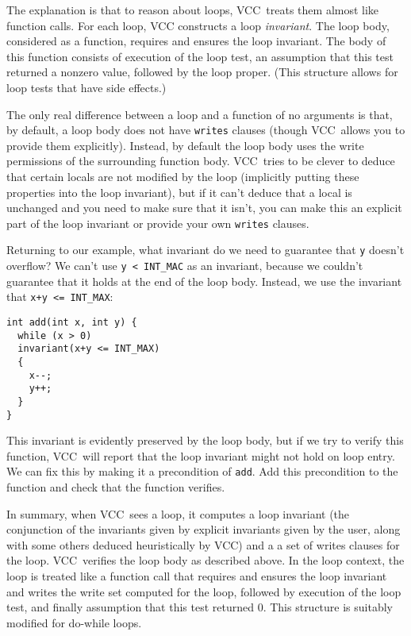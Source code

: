 \documentclass{report}
\newcommand{\Q}[1]{\lstinline~#1~}
\newcommand{\VCC}{VCC}
\newcommand{\Def}[1]{\emph{#1}}
\begin{document}
The explanation is that to reason about loops, \VCC\ treats them
almost like function calls. For each loop, VCC constructs a loop
\Def{invariant}. The loop body, considered as a function, requires
and ensures the loop invariant. The body of this function consists of
execution of the loop test, an assumption that this test returned a
nonzero value, followed by the loop proper. (This structure allows for
loop tests that have side effects.) 

The only real difference between a loop and a function of no arguments
is that, by default, a loop body does not have \Q{writes} clauses
(though \VCC\ allows you to provide them explicitly). Instead,  by
default the loop
body uses the write permissions of the surrounding function body.
\VCC\ tries to be clever to deduce that certain locals are not
modified by the loop (implicitly putting these properties into the
loop invariant), but if it can't deduce that a local is unchanged and
you need to make sure that it isn't, you can make this an explicit
part of the loop invariant or provide your own \Q{writes} clauses.

Returning to our example, what invariant do we need to guarantee that
\Q{y} doesn't overflow? We can't use \Q{y < INT_MAC} as an invariant,
because we couldn't guarantee that it holds at the end of the loop
body. Instead, we use the invariant that \Q{x+y <= INT_MAX}:
\begin{lstlisting}
int add(int x, int y) {
  while (x > 0)
  invariant(x+y <= INT_MAX)
  {
    x--;
    y++;
  }
}
\end{lstlisting}
This invariant is evidently preserved by the loop body, but if we try
to verify this function, \VCC\ will report that the loop invariant
might not hold on loop entry. We can fix this by making it a
precondition of \Q{add}. Add this precondition to the function and
check that the function verifies.

In summary, when \VCC\ sees a loop, it computes a loop invariant (the
conjunction of the invariants given by explicit invariants given by
the user, along with some others deduced heuristically by \VCC) and a
a set of writes clauses for the loop. \VCC\ verifies the loop body as
described above. In the loop context, 
the loop is treated like a function call that requires and ensures the 
loop invariant and writes the write set computed for the loop,
followed by execution of the loop test, and finally assumption that
this test returned 0. This structure is suitably modified for do-while loops.
\end{document}
